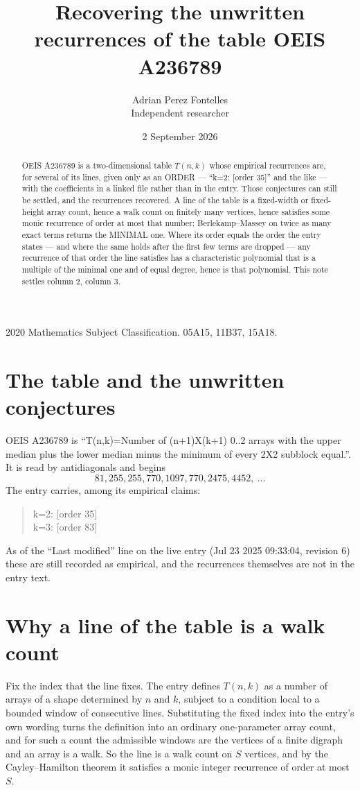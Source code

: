\documentclass[11pt,a4paper]{article}
\title{Recovering the unwritten recurrences of the table OEIS A236789}
\author{Adrian Perez Fontelles\\ \small Independent researcher}
\date{2 September 2026}
\theoremstyle{plain}
\theoremstyle{definition}
\begin{document}
\maketitle

\begin{abstract}
OEIS A236789 is a two-dimensional table $T(n,k)$ whose empirical recurrences are, for several of
its lines, given only as an ORDER --- ``k=2: [order 35]'' and the like --- with the
coefficients in a linked file rather than in the entry. Those conjectures can still be settled,
and the recurrences recovered. A line of the table is a fixed-width or fixed-height array
count, hence a walk count on finitely many vertices, hence satisfies some monic recurrence of
order at most that number; Berlekamp--Massey on twice as many exact terms returns the MINIMAL
one. Where its order equals the order the entry states --- and where the same holds after the
first few terms are dropped --- any recurrence of that order the line satisfies has a
characteristic polynomial that is a multiple of the minimal one and of equal degree, hence is
that polynomial. This note settles column 2, column 3.
\end{abstract}

\noindent\small 2020 Mathematics Subject Classification. 05A15, 11B37, 15A18.\normalsize

\section{The table and the unwritten conjectures}

OEIS A236789 is ``T(n,k)=Number of (n+1)X(k+1) 0..2 arrays with the upper median plus the lower median minus the minimum of every 2X2 subblock equal.''. It is read by antidiagonals and begins
\[
81, 255, 255, 770, 1097, 770, 2475, 4452,\ \dots
\]
The entry carries, among its empirical claims:
\begin{quote}\small
k=2: [order 35]\\
k=3: [order 83]
\end{quote}
As of the ``Last modified'' line on the live entry (Jul 23 2025 09:33:04, revision 6) these are still
recorded as empirical, and the recurrences themselves are not in the entry text.

\section{Why a line of the table is a walk count}

Fix the index that the line fixes. The entry defines $T(n,k)$ as a number of arrays of a shape
determined by $n$ and $k$, subject to a condition local to a bounded window of consecutive
lines. Substituting the fixed index into the entry's own wording turns the definition into an
ordinary one-parameter array count, and for such a count the admissible windows are the
vertices of a finite digraph and an array is a walk. So the line is a walk count on $S$
vertices, and by the Cayley--Hamilton theorem it satisfies a monic integer recurrence of order
at most $S$.
\end{document}
